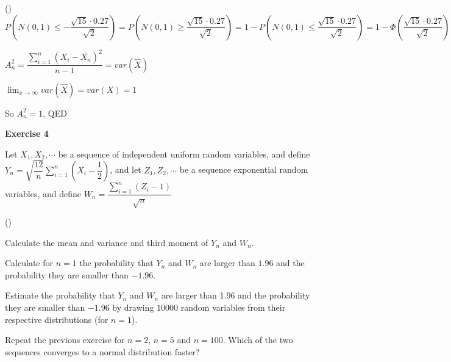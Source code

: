 \documentclass[12pt]{article}
\begin{document}
\begin{list}{()~}{}
$P\left(N\left(0, 1\right)\leq -\dfrac{\sqrt{15}\cdot 0.27}{\sqrt{2}}\right)=P\left(N\left(0, 1\right)\geq \dfrac{\sqrt{15}\cdot 0.27}{\sqrt{2}}\right) = 1 - P\left(N\left(0, 1\right)\leq \dfrac{\sqrt{15}\cdot 0.27}{\sqrt{2}}\right) = 1-\Phi\left(\dfrac{\sqrt{15}\cdot 0.27}{\sqrt{2}}\right)=1-\Phi\left(0.74\right) = 1-0.27 = 0.73$

\item $A_n^2 = \dfrac{\sum_{i = 1}^n\left(X_i-\overline{X_n}\right)^2}{n-1} = var(\hat{X})$

$\lim_{x \to \infty} var(\hat{X}) = var(X) = 1$

So $A_n^2 = 1$,  QED
\end{list}

\bigskip

\textbf{Exercise 4}

Let $X_1, X_2,\cdots$ be a sequence of independent uniform random variables, and define $Y_n=\sqrt{\dfrac{12}{n}}\sum_{i=1}^n\left(X_i-\dfrac{1}{2}\right)$, and let $Z_1, Z_2,\cdots$ be a sequence exponential random variables, and define $W_n = \dfrac{\sum_{i=1}^n\left(Z_i-1\right)}{\sqrt{n}}$

\begin{list}{()~}{}
\item Calculate the mean and variance and third moment of $Y_n$ and $W_n$.
\item Calculate for $n=1$ the probability that $Y_n$ and $W_n$ are larger
than $1.96$ and the probability they are smaller than $-1.96$.
\item Estimate the probability that $Y_n$ and $W_n$ are larger than 1.96 and the probability they are smaller than $-1.96$ by drawing $10000$ random variables from their respective distributions (for $n = 1$).
\item Repeat the previous exercise for $n=2$, $n=5$ and $n=100$. Which of the two sequences converges to a normal distribution faster?
\end{list}
\medskip
\end{document}
